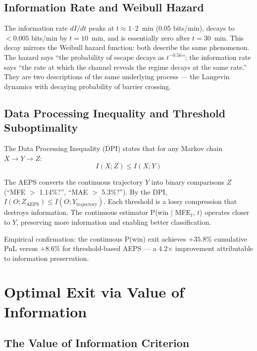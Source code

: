 \documentclass[11pt,a4paper]{article}
\begin{document}
\subsection{Information Rate and Weibull Hazard}

The information rate $dI/dt$ peaks at $t \approx 1$--$2$~min (0.05 bits/min), decays to $< 0.005$ bits/min by $t = 10$~min, and is essentially zero after $t = 30$~min. This decay mirrors the Weibull hazard function: both describe the same phenomenon. The hazard says ``the probability of escape decays as $t^{-0.56}$''; the information rate says ``the rate at which the channel reveals the regime decays at the same rate.'' They are two descriptions of the same underlying process --- the Langevin dynamics with decaying probability of barrier crossing.

\subsection{Data Processing Inequality and Threshold Suboptimality}

The Data Processing Inequality (DPI) states that for any Markov chain $X \to Y \to Z$:
\begin{equation}
I(X; Z) \leq I(X; Y)
\end{equation}

The AEPS converts the continuous trajectory $Y$ into binary comparisons $Z$ (``MFE $>$ 1.14\%?'', ``MAE $>$ 5.3\%?''). By the DPI, $I(O; Z_{\text{AEPS}}) \leq I(O; Y_{\text{trajectory}})$. Each threshold is a lossy compression that destroys information. The continuous estimator P(win $|$ MFE$_t$, $t$) operates closer to $Y$, preserving more information and enabling better classification.

Empirical confirmation: the continuous P(win) exit achieves $+35.8\%$ cumulative PnL versus $+8.6\%$ for threshold-based AEPS --- a 4.2$\times$ improvement attributable to information preservation.


\section{Optimal Exit via Value of Information}
\label{sec:voi}

\subsection{The Value of Information Criterion}
\end{document}
